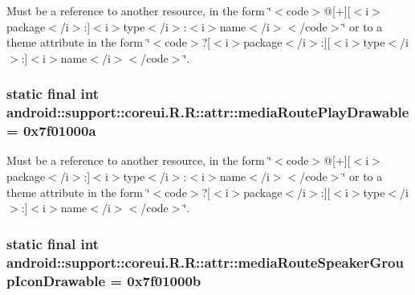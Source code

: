 Must be a reference to another resource, in the form \char`\"{}$<$code$>$@\mbox{[}+\mbox{]}\mbox{[}$<$i$>$package$<$/i$>$:\mbox{]}$<$i$>$type$<$/i$>$:$<$i$>$name$<$/i$>$$<$/code$>$\char`\"{} or to a theme attribute in the form \char`\"{}$<$code$>$?\mbox{[}$<$i$>$package$<$/i$>$:\mbox{]}\mbox{[}$<$i$>$type$<$/i$>$:\mbox{]}$<$i$>$name$<$/i$>$$<$/code$>$\char`\"{}. \hypertarget{classandroid_1_1support_1_1coreui_1_1_r_1_1attr_52101ccaffc3a65d927239faea5f605f}{
\subsubsection[{mediaRoutePlayDrawable}]{\setlength{\rightskip}{0pt plus 5cm}static final int android::support::coreui.R.R::attr::mediaRoutePlayDrawable = 0x7f01000a}}
\label{classandroid_1_1support_1_1coreui_1_1_r_1_1attr_52101ccaffc3a65d927239faea5f605f}


Must be a reference to another resource, in the form \char`\"{}$<$code$>$@\mbox{[}+\mbox{]}\mbox{[}$<$i$>$package$<$/i$>$:\mbox{]}$<$i$>$type$<$/i$>$:$<$i$>$name$<$/i$>$$<$/code$>$\char`\"{} or to a theme attribute in the form \char`\"{}$<$code$>$?\mbox{[}$<$i$>$package$<$/i$>$:\mbox{]}\mbox{[}$<$i$>$type$<$/i$>$:\mbox{]}$<$i$>$name$<$/i$>$$<$/code$>$\char`\"{}. \hypertarget{classandroid_1_1support_1_1coreui_1_1_r_1_1attr_ec51bd3e548a8b3c6f5b91215420cafb}{
\subsubsection[{mediaRouteSpeakerGroupIconDrawable}]{\setlength{\rightskip}{0pt plus 5cm}static final int android::support::coreui.R.R::attr::mediaRouteSpeakerGroupIconDrawable = 0x7f01000b}}
\label{classandroid_1_1support_1_1coreui_1_1_r_1_1attr_ec51bd3e548a8b3c6f5b91215420cafb}


